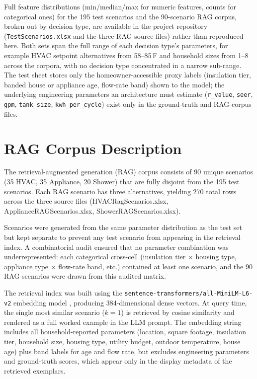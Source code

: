 \documentclass[final,3p,times]{elsarticle}
\begin{document}
Full feature distributions (min/median/max for numeric features, counts for categorical ones) for the 195 test scenarios and the 90-scenario RAG corpus, broken out by decision type, are available in the project repository (\texttt{TestScenarios.xlsx} and the three RAG source files) rather than reproduced here. Both sets span the full range of each decision type's parameters, for example HVAC setpoint alternatives from 58--85\,\textdegree{}F and household sizes from 1--8 across the corpora, with no decision type concentrated in a narrow sub-range. The test sheet stores only the homeowner-accessible proxy labels (insulation tier, banded house or appliance age, flow-rate band) shown to the model; the underlying engineering parameters an architecture must estimate (\texttt{r\_value}, \texttt{seer}, \texttt{gpm}, \texttt{tank\_size}, \texttt{kwh\_per\_cycle}) exist only in the ground-truth and RAG-corpus files.

\FloatBarrier
\section{RAG Corpus Description}
\label{app:rag_corpus}

The retrieval-augmented generation (RAG) corpus consists of 90 unique
scenarios (35 HVAC, 35 Appliance, 20 Shower) that are fully disjoint
from the 195 test scenarios. Each RAG scenario has three alternatives,
yielding 270 total rows across the three source files
(HVACRagScenarios.xlsx, ApplianceRAGScenarios.xlsx,
ShowerRAGScenarios.xlsx).

Scenarios were generated from the same parameter distribution as the test
set but kept separate to prevent any test scenario from appearing in the
retrieval index. A combinatorial audit ensured that no parameter
combination was underrepresented: each categorical cross-cell (insulation
tier $\times$ housing type, appliance type $\times$ flow-rate band, etc.)
contained at least one scenario, and the 90 RAG scenarios were drawn from
this audited matrix.

The retrieval index was built using the
\texttt{sentence-transformers/all-MiniLM-L6-v2} embedding model
\cite{reimers2019sentencebert}, producing 384-dimensional dense vectors.
At query time, the single most similar scenario ($k=1$) is retrieved by
cosine similarity and rendered as a full worked example in the LLM prompt.
The embedding string includes all household-reported parameters (location,
square footage, insulation tier, household size, housing type, utility
budget, outdoor temperature, house age) plus band labels for age and flow
rate, but excludes engineering parameters and ground-truth scores, which
appear only in the display metadata of the retrieved exemplars.
\end{document}
